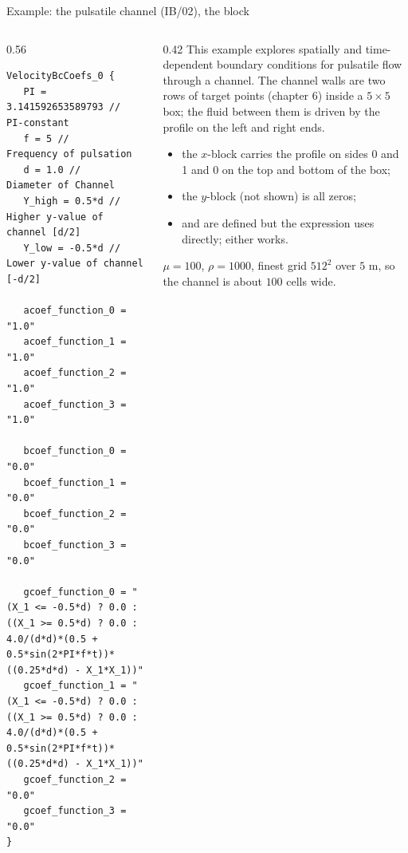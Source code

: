 \documentclass[aspectratio=169,11pt]{beamer}
\begin{document}
\begin{frame}[fragile]{Example: the pulsatile channel (IB/02), the block}
\label{fr:ib02}
\begin{columns}[T,onlytextwidth]
\begin{column}{0.56\textwidth}
\begin{lstlisting}[style=inputtiny]
VelocityBcCoefs_0 {
   PI = 3.141592653589793 //  PI-constant
   f = 5 //                   Frequency of pulsation
   d = 1.0 //                 Diameter of Channel
   Y_high = 0.5*d //          Higher y-value of channel [d/2]
   Y_low = -0.5*d //          Lower y-value of channel  [-d/2]

   acoef_function_0 = "1.0"
   acoef_function_1 = "1.0"
   acoef_function_2 = "1.0"
   acoef_function_3 = "1.0"

   bcoef_function_0 = "0.0"
   bcoef_function_1 = "0.0"
   bcoef_function_2 = "0.0"
   bcoef_function_3 = "0.0"

   gcoef_function_0 = "(X_1 <= -0.5*d) ? 0.0 : ((X_1 >= 0.5*d) ? 0.0 : 4.0/(d*d)*(0.5 + 0.5*sin(2*PI*f*t))*((0.25*d*d) - X_1*X_1))"
   gcoef_function_1 = "(X_1 <= -0.5*d) ? 0.0 : ((X_1 >= 0.5*d) ? 0.0 : 4.0/(d*d)*(0.5 + 0.5*sin(2*PI*f*t))*((0.25*d*d) - X_1*X_1))"
   gcoef_function_2 = "0.0"
   gcoef_function_3 = "0.0"
}
\end{lstlisting}
\end{column}
\begin{column}{0.42\textwidth}
\footnotesize This example explores spatially and time-dependent boundary conditions for pulsatile flow through a channel. The channel walls are two rows of target points (chapter 6) inside a $5 \times 5$ box; the fluid between them is driven by the profile on the left and right ends.
\begin{itemize}
  \item the $x$-block carries the profile on sides 0 and 1 and $0$ on the top and bottom of the box;
  \item the $y$-block (not shown) is all zeros;
  \item {} and  are defined but the expression uses  directly; either works.
\end{itemize}
\footnotesize $\mu = 100$, $\rho = 1000$, finest grid $512^2$ over $5$ m, so the channel is about $100$ cells wide.
\end{column}
\end{columns}
\end{frame}
\end{document}
